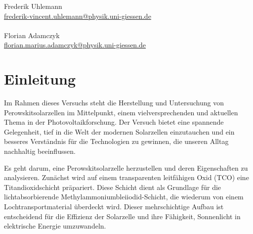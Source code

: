 \documentclass[12pt,a4paper,ngerman]{report}
\begin{document}
\begin{titlepage}
\begin{minipage}{0.49\textwidth}
\begin{flushright}
				\large{Frederik Uhlemann}\\
				\small{\href{mailto:frederik-vincent.uhlemann@physik.uni-giessen.de}{frederik-vincent.uhlemann@physik.uni-giessen.de}\\~\\
				}
				\large{Florian Adamczyk} \\
				\small{\href{mailto:florian.marius.adamczyk@physik.uni-giessen.de}{florian.marius.adamczyk@physik.uni-giessen.de}\\
			}
		\end{flushright}
	\end{minipage}
	
	\end{titlepage}
	
\setcounter{secnumdepth}{2}
\setcounter{tocdepth}{3}
\tableofcontents


	
\chapter*{Einleitung}
Im Rahmen dieses Versuchs steht die Herstellung und Untersuchung von Perowskitsolarzellen im Mittelpunkt, einem vielversprechenden und aktuellen Thema in der Photovoltaikforschung. Der Versuch bietet eine spannende Gelegenheit, tief in die Welt der modernen Solarzellen einzutauchen und ein besseres Verständnis für die Technologien zu gewinnen, die unseren Alltag nachhaltig beeinflussen.

Es geht darum, eine Perowskitsolarzelle herzustellen und deren Eigenschaften zu analysieren. Zunächst wird auf einem transparenten leitfähigen Oxid (TCO) eine Titandioxidschicht präpariert. Diese Schicht dient als Grundlage für die lichtabsorbierende Methylammoniumbleiiodid-Schicht, die wiederum von einem Lochtransportmaterial überdeckt wird. Dieser mehrschichtige Aufbau ist entscheidend für die Effizienz der Solarzelle und ihre Fähigkeit, Sonnenlicht in elektrische Energie umzuwandeln.
\end{document}

